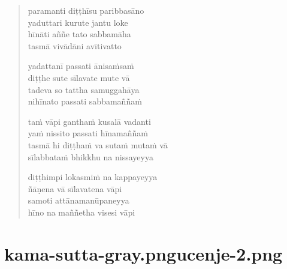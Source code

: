 

\cleartoverso

\vspace*{30mm}

\begin{verse}

paramanti diṭṭhīsu paribbasāno\\
yaduttari kurute jantu loke\\
hīnāti aññe tato sabbamāha\\
tasmā vivādāni avītivatto

yadattanī passati ānisaṁsaṁ\\
diṭṭhe sute sīlavate mute vā\\
tadeva so tattha samuggahāya\\
nihīnato passati sabbamaññaṁ

taṁ vāpi ganthaṁ kusalā vadanti\\
yaṁ nissito passati hīnamaññaṁ\\
tasmā hi diṭṭhaṁ va sutaṁ mutaṁ vā\\
sīlabbataṁ bhikkhu na nissayeyya

diṭṭhimpi lokasmiṁ na kappayeyya\\
ñāṇena vā sīlavatena vāpi\\
samoti attānamanūpaneyya\\
hīno na maññetha visesi vāpi

\end{verse}


\chapter[Paramaṭṭhaka Sutta]{{kama-sutta-gray.png}{ucenje-2.png}}

